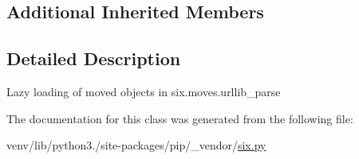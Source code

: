 \subsection*{Additional Inherited Members}


\subsection{Detailed Description}
\begin{DoxyVerb}Lazy loading of moved objects in six.moves.urllib_parse\end{DoxyVerb}
 

The documentation for this class was generated from the following file\+:\begin{DoxyCompactItemize}
\item 
venv/lib/python3./site-\/packages/pip/\+\_\+vendor/\hyperlink{pip_2__vendor_2six_8py}{six.\+py}\end{DoxyCompactItemize}
